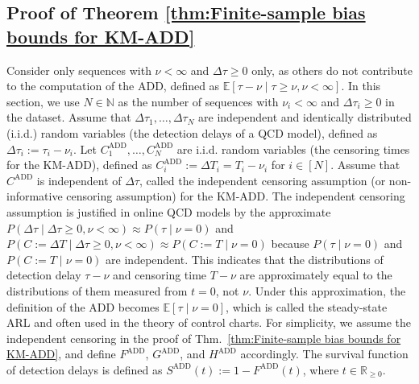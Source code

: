 \documentclass{article}
\theoremstyle{plain}
\theoremstyle{definition}
\theoremstyle{remark}
\def\mbr{\mathbb{R}}
\def\mbn{\mathbb{N}}
\def\mbe{\mathbb{E}}
\begin{document}
\subsection{Proof of Theorem \ref{thm:Finite-sample bias bounds for KM-ADD}} \label{app:Proof of B_FS for KM-ADD}
Consider only sequences with $\nu < \infty$ and $\Delta \tau \geq 0$ only, as others do not contribute to the computation of the ADD, defined as $\mbe[\tau - \nu \mid  \tau \geq \nu, \nu < \infty]$.
In this section, we use $N \in \mbn$ as the number of sequences with $\nu_i < \infty$ and $\Delta \tau_i \geq 0$ in the dataset.
Assume that $\Delta\tau_1,\dots,\Delta\tau_{N}$ are independent and identically distributed (i.i.d.) random variables (the detection delays of a QCD model), defined as $\Delta \tau_i := \tau_i - \nu_i$. 
Let $C_1^\mathrm{ADD}, \ldots, C_N^\mathrm{ADD}$ are i.i.d. random variables (the censoring times for the KM-ADD), defined as $C_i^\mathrm{ADD} := \Delta T_i = T_i - \nu_i$ for $i \in [N]$.
Assume that $C^\mathrm{ADD}$ is independent of $\Delta\tau$, called the independent censoring assumption (or non-informative censoring assumption) for the KM-ADD.
The independent censoring assumption is justified in online QCD models by the approximate $P(\Delta \tau \mid \Delta \tau \geq 0, \nu < \infty) \approx P(\tau \mid \nu=0)$ and $P(C:= \Delta T \mid \Delta \tau \geq 0, \nu < \infty) \approx P(C:= T \mid \nu = 0)$ because $P(\tau \mid \nu=0)$ and $P(C:= T \mid \nu = 0)$ are independent.
This indicates that the distributions of detection delay $\tau - \nu$ and censoring time $T - \nu$ are approximately equal to the distributions of them measured from $t=0$, not $\nu$.
Under this approximation, the definition of the ADD becomes $\mbe[\tau \mid \nu=0]$, which is called the steady-state ARL \citep{saccucci1990average, sasikumr2025comprehensive, lim2025efficient} and often used in the theory of control charts.
For simplicity, we assume the independent censoring in the proof of Thm.~\ref{thm:Finite-sample bias bounds for KM-ADD}, and define $F^\mathrm{ADD}$, $G^\mathrm{ADD}$, and $H^\mathrm{ADD}$ accordingly.
The survival function of detection delays is defined as $S^\mathrm{ADD}(t) := 1 - F^\mathrm{ADD}(t)$, where $t \in \mbr_{\geq 0}$.
\end{document}
